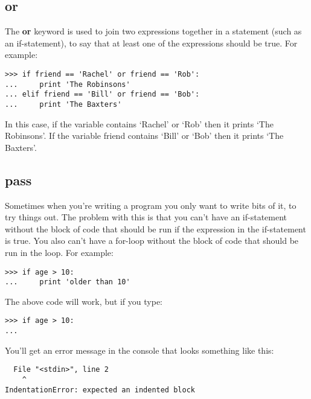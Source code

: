 \subsection*{or}

The \textbf{or} keyword is used to join two expressions together in a statement (such as an if-statement), to say that at least one of the expressions should be true.  For example:

\begin{listing}
\begin{verbatim}
>>> if friend == 'Rachel' or friend == 'Rob':
...     print 'The Robinsons'
... elif friend == 'Bill' or friend == 'Bob':
...     print 'The Baxters'
\end{verbatim}
\end{listing}

In this case, if the variable  contains `Rachel' or `Rob' then it prints `The Robinsons'.  If the variable friend contains `Bill' or `Bob' then it prints `The Baxters'.

\subsection*{pass}

Sometimes when you're writing a program you only want to write bits of it, to try things out.  The problem with this is that you can't have an if-statement without the block of code that should be run if the expression in the if-statement is true. You also can't have a for-loop without the block of code that should be run in the loop. For example:

\begin{listing}
\begin{verbatim}
>>> if age > 10:
...     print 'older than 10'
\end{verbatim}
\end{listing}

\noindent
The above code will work, but if you type:

\begin{listing}
\begin{verbatim}
>>> if age > 10:
...
\end{verbatim}
\end{listing}

\noindent
You'll get an error message in the console that looks something like this:

\begin{listing}
\begin{verbatim}
  File "<stdin>", line 2
    ^
IndentationError: expected an indented block
\end{verbatim}
\end{listing}

